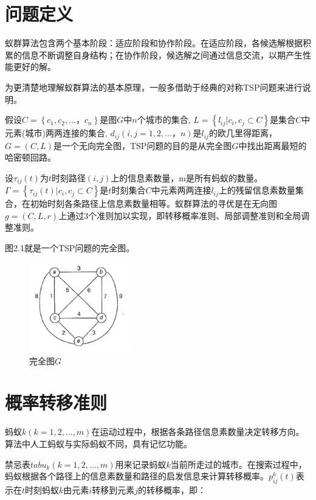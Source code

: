 \documentclass[a4paper,12pt]{report}
\begin{document}
\begin{spacing}{1.5}
\songti{}

\section{问题定义}
	蚁群算法包含两个基本阶段：适应阶段和协作阶段。在适应阶段，各候选解根据积累的信息不断调整自身结构；在协作阶段，候选解之间通过信息交流，以期产生性能更好的解。
	
	为更清楚地理解蚁群算法的基本原理，一般多借助于经典的对称TSP问题来进行说明。
	
	假设$C=\left\{c_1,c_2,…，c_n \right\}$是图$G$中$n$个城市的集合, $L=\left\{l_{ij}|c_i,c_j\subset C \right\}$是集合$C$中元素(城市)两两连接的集合, $d_{ij}(i,j=1,2,…，n)$是$l_{ij}$的欧几里得距离，$G=(C,L)$是一个无向完全图，TSP问题的目的是从完全图$G$中找出距离最短的哈密顿回路。 

	设$\tau_{ij}(t)$为$t$时刻路径$(i,j)$上的信息素数量，m是所有蚂蚁的数量。$\Gamma =\left\{ \tau_{ij}(t)|c_i,c_j\subset C \right\}$是$t$时刻集合$C$中元素两两连接$l_{ij}$上的残留信息素数量集合，在初始时刻各条路径上信息素数量相等。蚁群算法的寻优是在无向图$g=(C,L,r)$上通过3个准则加以实现，即转移概率准则、局部调整准则和全局调整准则。

	图2.1就是一个TSP问题的完全图。
	\begin{figure}[htbp]
		\centering
		\includegraphics[width=0.4\textwidth]{pic/ant2.png}
		\caption{完全图$G$}
		\label{fig:pt1}
	\end{figure}

\section{概率转移准则}
	蚂蚁$k(k=1,2,…,m)$在运动过程中，根据各条路径信息素数量决定转移方向。算法中人工蚂蚁与实际蚂蚁不同，具有记忆功能。	

	禁忌表$tabu_k(k=1,2,…,m)$用来记录蚂蚁$k$当前所走过的城市。在搜索过程中，蚂蚁根据各个路径上的信息素数量和路径的启发信息来计算转移概率。$p_{ij}^k(t)$表示在$t$时刻蚂蚁$k$由元素$i$转移到元素$j$的转移概率，即：


\end{spacing}
\end{document}
